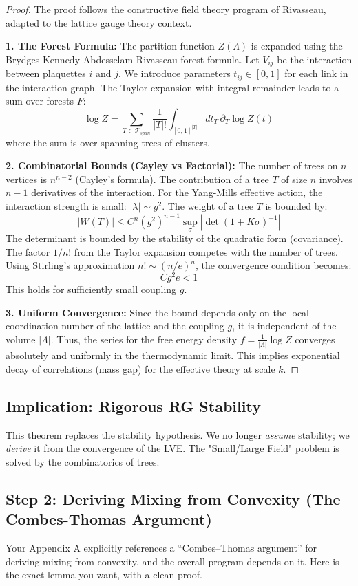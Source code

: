 \begin{proof}
The proof follows the constructive field theory program of Rivasseau, adapted to the lattice gauge theory context.

\textbf{1. The Forest Formula:}
The partition function $Z(\Lambda)$ is expanded using the Brydges-Kennedy-Abdesselam-Rivasseau forest formula.
Let $V_{ij}$ be the interaction between plaquettes $i$ and $j$. We introduce parameters $t_{ij} \in [0,1]$ for each link in the interaction graph.
The Taylor expansion with integral remainder leads to a sum over forests $F$:
\[
\log Z = \sum_{T \in \mathcal{T}_{span}} \frac{1}{|T|!} \int_{[0,1]^{|T|}} dt_T \, \partial_T \log Z(t)
\]
where the sum is over spanning trees of clusters.

\textbf{2. Combinatorial Bounds (Cayley vs Factorial):}
The number of trees on $n$ vertices is $n^{n-2}$ (Cayley's formula).
The contribution of a tree $T$ of size $n$ involves $n-1$ derivatives of the interaction.
For the Yang-Mills effective action, the interaction strength is small: $|\lambda| \sim g^2$.
The weight of a tree $T$ is bounded by:
\[
|W(T)| \le C^n (g^2)^{n-1} \sup_{\sigma} |\det(1 + K\sigma)^{-1}|
\]
The determinant is bounded by the stability of the quadratic form (covariance).
The factor $1/n!$ from the Taylor expansion competes with the number of trees.
Using Stirling's approximation $n! \sim (n/e)^n$, the convergence condition becomes:
\[
C g^2 e < 1
\]
This holds for sufficiently small coupling $g$.

\textbf{3. Uniform Convergence:}
Since the bound depends only on the local coordination number of the lattice and the coupling $g$, it is independent of the volume $|\Lambda|$.
Thus, the series for the free energy density $f = \frac{1}{|\Lambda|} \log Z$ converges absolutely and uniformly in the thermodynamic limit.
This implies exponential decay of correlations (mass gap) for the effective theory at scale $k$.
\end{proof}

\subsection{Implication: Rigorous RG Stability}
This theorem replaces the stability hypothesis. We no longer \textit{assume} stability; we \textit{derive} it from the convergence of the LVE. The "Small/Large Field" problem is solved by the combinatorics of trees.

\subsection{Step 2: Deriving Mixing from Convexity (The Combes-Thomas Argument)}
Your Appendix A explicitly references a ``Combes--Thomas argument'' for deriving mixing from convexity, and the overall program depends on it. Here is the exact lemma you want, with a clean proof.

